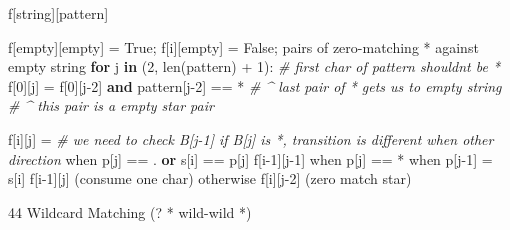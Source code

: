 \documentclass[
]{article}
\newenvironment{Shaded}{}{}
\newcommand{\BuiltInTok}[1]{#1}
\newcommand{\CommentTok}[1]{\textcolor[rgb]{0.38,0.63,0.69}{\textit{#1}}}
\newcommand{\ControlFlowTok}[1]{\textcolor[rgb]{0.00,0.44,0.13}{\textbf{#1}}}
\newcommand{\DecValTok}[1]{\textcolor[rgb]{0.25,0.63,0.44}{#1}}
\newcommand{\KeywordTok}[1]{\textcolor[rgb]{0.00,0.44,0.13}{\textbf{#1}}}
\newcommand{\NormalTok}[1]{#1}
\newcommand{\OperatorTok}[1]{\textcolor[rgb]{0.40,0.40,0.40}{#1}}
\newcommand{\StringTok}[1]{\textcolor[rgb]{0.25,0.44,0.63}{#1}}
\newcommand{\VariableTok}[1]{\textcolor[rgb]{0.10,0.09,0.49}{#1}}
\begin{document}
\begin{Shaded}
\begin{Highlighting}[]
\NormalTok{f[string][pattern]}

\NormalTok{f[empty][empty] }\OperatorTok{=} \VariableTok{True}\OperatorTok{;}\NormalTok{ f[i][empty] }\OperatorTok{=} \VariableTok{False}\OperatorTok{;}\NormalTok{ pairs of zero}\OperatorTok{{-}}\NormalTok{matching }\OperatorTok{*}\NormalTok{ against empty string}
\ControlFlowTok{for}\NormalTok{ j }\KeywordTok{in}\NormalTok{ (}\DecValTok{2}\NormalTok{, }\BuiltInTok{len}\NormalTok{(pattern) }\OperatorTok{+} \DecValTok{1}\NormalTok{):  }\CommentTok{\# first char of pattern shouldn\textquotesingle{}t be *}
\NormalTok{  f[}\DecValTok{0}\NormalTok{][j] }\OperatorTok{=}\NormalTok{ f[}\DecValTok{0}\NormalTok{][j}\OperatorTok{{-}}\DecValTok{2}\NormalTok{] }\KeywordTok{and}\NormalTok{ pattern[j}\OperatorTok{{-}}\DecValTok{2}\NormalTok{] }\OperatorTok{==} \StringTok{\textquotesingle{}*\textquotesingle{}}
  \CommentTok{\# 				\^{} last pair of * gets us to empty string}
  \CommentTok{\#												\^{} this pair is a empty star pair}

\NormalTok{f[i][j] }\OperatorTok{=}   \CommentTok{\# we need to check B[j{-}1] if B[j] is *, transition is different when other direction}
\NormalTok{					when p[j] }\OperatorTok{==} \StringTok{\textquotesingle{}.\textquotesingle{}} \KeywordTok{or}\NormalTok{ s[i] }\OperatorTok{==}\NormalTok{ p[j]			f[i}\OperatorTok{{-}}\DecValTok{1}\NormalTok{][j}\OperatorTok{{-}}\DecValTok{1}\NormalTok{] }
\NormalTok{  				when p[j] }\OperatorTok{==} \StringTok{\textquotesingle{}*\textquotesingle{}}
\NormalTok{    												when p[j}\OperatorTok{{-}}\DecValTok{1}\NormalTok{] }\OperatorTok{=}\NormalTok{ s[i] 	f[i}\OperatorTok{{-}}\DecValTok{1}\NormalTok{][j] (consume one char)}
\NormalTok{      											otherwise						f[i][j}\OperatorTok{{-}}\DecValTok{2}\NormalTok{] (zero match star)}
\end{Highlighting}
\end{Shaded}

44 Wildcard Matching (? * wild-wild *)
\end{document}
